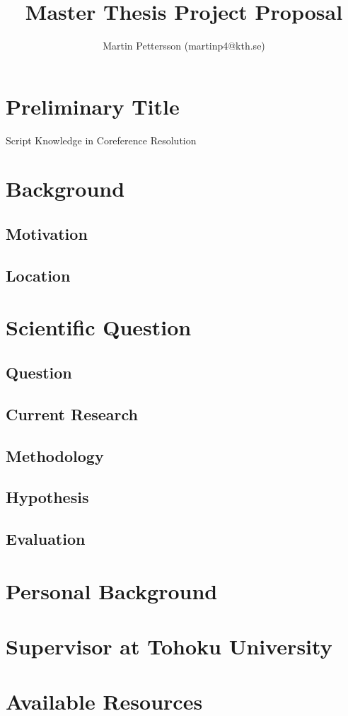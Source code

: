 \documentclass{article}
\begin{document}
\title{Master Thesis Project Proposal}
\author{Martin Pettersson (martinp4@kth.se)}
\maketitle

\section{Preliminary Title}
Script Knowledge in Coreference Resolution

\section{Background}

\subsection{Motivation}

\subsection{Location}

\section{Scientific Question}

\subsection{Question}

\subsection{Current Research}

\subsection{Methodology}

\subsection{Hypothesis}

\subsection{Evaluation}

\section{Personal Background}

\section{Supervisor at Tohoku University}

\section{Available Resources}
\end{document}
